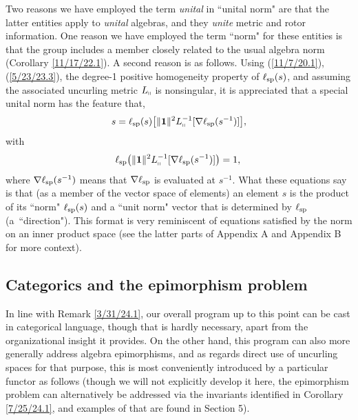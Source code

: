 \documentclass{amsart}
\numberwithin{equation}{section}
\theoremstyle{definition}
\numberwithin{theorem}{section}
\begin{document}
Two reasons we have employed the term {\it unital} in ``unital norm" are that the latter entities apply to {\it unital} algebras, and they {\it unite} metric and rotor information.  One reason we have employed the term ``norm" for these entities is that the group includes a member closely related to the usual algebra norm (Corollary \ref{11/17/22.1}).  A second reason is as follows.   Using (\ref{11/7/20.1}), (\ref{5/23/23.3}), the degree-1 positive homogeneity property of $\ell_{\rm sp}(s)$, and assuming the associated uncurling metric $L_{\shortparallel}$ is nonsingular, it is appreciated that a special unital norm has the feature that,
\begin{equation}\label{5/22/24.5}  s = \ell_{\rm sp}(s)\big[\|\mathbf{1}\|^2 L_{\shortparallel}^{-1}[\nabla\ell_{\rm sp}(s^{-1})]\big],\end{equation} with
\begin{equation}\label{5/22/24.6}\ell_{\rm sp}\big(\|\mathbf{1}\|^2 L_{\shortparallel}^{-1}[\nabla\ell_{\rm sp}(s^{-1})]\big) = 1,\,\end{equation}
where $\nabla\ell_{\rm sp}(s^{-1})$ means that $\nabla\ell_{\rm sp}$ is evaluated at $s^{-1}$.  What these equations say is that (as a member of the vector space of elements) an element $s$ is the product of its ``norm" $\ell_{\rm sp}(s)$ and a ``unit norm" vector that is determined by $\ell_{\rm sp}$ (\mbox{a ``direction"}).  This format is very reminiscent of equations satisfied by the norm on an inner product space (see the latter parts of Appendix A and Appendix B for more context).

\subsection{Categorics and the epimorphism problem}
 In line with Remark \ref{3/31/24.1}, our overall program up to this point can be cast in categorical language, though that is hardly necessary, apart from the organizational insight it provides. 
On the other hand, this program can also more generally address algebra epimorphisms, and as regards direct use of uncurling spaces for that purpose, this is most conveniently introduced by a particular functor as follows (though we will not explicitly develop it here, the epimorphism problem can alternatively be addressed via the invariants identified in Corollary \ref{7/25/24.1}, and examples of that are found in Section 5).  
\end{document}

